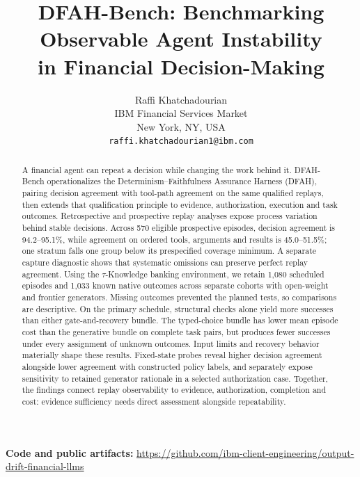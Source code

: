 \documentclass{article}
\begin{document}
\title{DFAH-Bench: Benchmarking Observable Agent Instability\\in Financial Decision-Making}

\author{
  Raffi Khatchadourian \\
  IBM Financial Services Market \\
  New York, NY, USA \\
  \texttt{raffi.khatchadourian1@ibm.com}
}

\maketitle

\begin{abstract}
A financial agent can repeat a decision while changing the work behind it.
DFAH-Bench operationalizes the Determinism--Faithfulness Assurance Harness
(DFAH), pairing decision agreement with tool-path agreement on the same
qualified replays, then extends that qualification principle to evidence,
authorization, execution and task outcomes.
Retrospective and prospective replay analyses expose process variation behind
stable decisions. Across 570 eligible prospective episodes, decision agreement
is 94.2--95.1\%, while agreement on ordered tools, arguments and results is
45.0--51.5\%; one stratum falls one group below its prespecified coverage
minimum. A separate capture diagnostic shows that systematic omissions can
preserve perfect replay agreement.
Using the $\tau$-Knowledge banking environment, we retain 1,080 scheduled
episodes and 1,033 known native outcomes across separate cohorts with
open-weight and frontier generators. Missing outcomes prevented the planned
tests, so comparisons are descriptive. On the primary schedule, structural
checks alone yield more successes than either
gate-and-recovery bundle. The typed-choice
bundle has lower mean episode cost than the generative bundle on complete task
pairs, but produces fewer successes under every assignment of unknown outcomes.
Input limits and recovery behavior materially shape these results.
Fixed-state probes reveal higher decision agreement alongside lower agreement
with constructed policy labels, and separately expose sensitivity to retained
generator rationale in a selected authorization case. Together, the findings
connect replay observability to evidence,
authorization, completion and cost: evidence sufficiency needs direct assessment
alongside repeatability.
\end{abstract}

\begin{center}
\textbf{Code and public artifacts:}
\url{https://github.com/ibm-client-engineering/output-drift-financial-llms}
\end{center}
\end{document}
